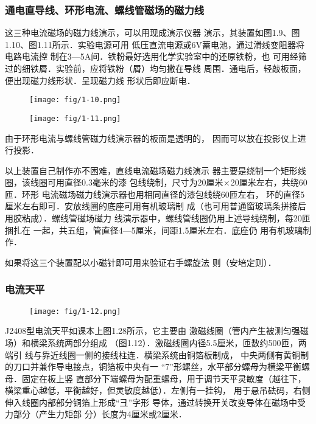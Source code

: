 \subsubsection{通电直导线、环形电流、螺线管磁场的磁力线}
这三种电流磁场的磁力线演示，可以用现成演示仪器
演示，其装置如图1.9、图1.10、图1.11所示．实验电源可用
低压直流电源或6V蓄电池，通过滑线变阻器将电路电流控
制在3—5A间．铁粉最好选用化学实验室中的还原铁粉，也
可用经筛过的细铁屑．实验前，应将铁粉（屑）均匀撒在导线
周围．通电后，轻敲板面，便出现磁力线形状．呈现磁力线
形状后即应断电．

\begin{figure}[htp]\centering
    \begin{minipage}[t]{0.48\textwidth}
    \centering
\texttt{[image: fig/1-10.png]}
    \caption{}
    \end{minipage}
    \begin{minipage}[t]{0.48\textwidth}
    \centering
\texttt{[image: fig/1-11.png]}
    \caption{}
    \end{minipage}
    \end{figure}

由于环形电流与螺线管磁力线演示器的板面是透明的，
因而可以放在投影仪上进行投影．

以上装置自己制作亦不困难，直线电流磁场磁力线演示
器主要是绕制一个矩形线圈，该线圈可用直径0.3毫米的漆
包线绕制，尺寸为20厘米$\times$20厘米左右，共绕60匝．环形
电流磁场磁力线演示器也用相同直径的漆包线绕60匝左右，
环的直径5厘米左右即可．安放线圈的底座可用有机玻璃制
成（也可用普通窗玻璃条拼接后用胶粘成）．螺线管磁场磁力
线演示器中，螺线管线圈仍用上述导线绕制，每20匝捆扎在
一起，共五组，管直径4—5厘米，间距1.5厘米左右．底座仍
用有机玻璃制作．

如果将这三个装置配以小磁针即可用来验证右手螺旋法
则（安培定则）．


\subsubsection{电流天平}
\begin{figure}[htp]
    \centering
\texttt{[image: fig/1-12.png]}
    \caption{}
\end{figure}

J2408型电流天平如课本上图1.28所示，它主要由
激磁线圈（管内产生被测匀强磁场）和横梁系统两部分组成
（图1.12）．激磁线圈内径5.5厘米，匝数约500匝，两端引
线与靠近线圈一侧的接线柱连．横梁系统由铜箔板制成，
中央两侧有黄铜制的刀口并兼作导电接点，铜箔板中央有一
“7”形螺丝，水平部分螺母为横梁平衡螺母．固定在板上竖
直部分下端螺母为配重螺母，用于调节天平灵敏度（越往下，
横梁重心越低，平衡越好，但灵敏度越低）．左侧有一挂钩，
用于悬吊砝码，右侧伸入线圈内部部分铜箔上形成“彐”字形
导体，通过转换开关改变导体在磁场中受力部分（产生力矩部
分）长度为4厘米或2厘米．

